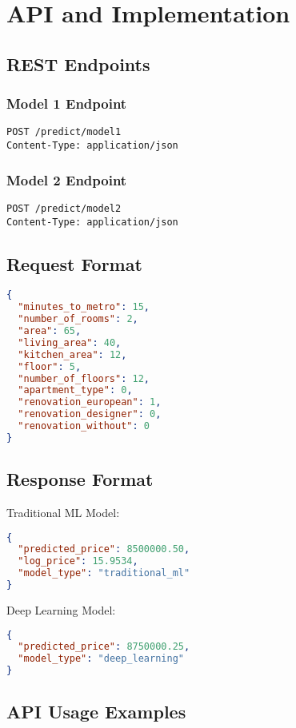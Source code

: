 \documentclass[12pt,a4paper]{report}
\begin{document}
\chapter{API and Implementation}
\section{REST Endpoints}
\subsection{Model 1 Endpoint}
\begin{verbatim}
POST /predict/model1
Content-Type: application/json
\end{verbatim}

\subsection{Model 2 Endpoint}
\begin{verbatim}
POST /predict/model2
Content-Type: application/json
\end{verbatim}

\section{Request Format}
\begin{lstlisting}[language=json]
{
  "minutes_to_metro": 15,
  "number_of_rooms": 2,
  "area": 65,
  "living_area": 40,
  "kitchen_area": 12,
  "floor": 5,
  "number_of_floors": 12,
  "apartment_type": 0,
  "renovation_european": 1,
  "renovation_designer": 0,
  "renovation_without": 0
}
\end{lstlisting}

\section{Response Format}
Traditional ML Model:
\begin{lstlisting}[language=json]
{
  "predicted_price": 8500000.50,
  "log_price": 15.9534,
  "model_type": "traditional_ml"
}
\end{lstlisting}

Deep Learning Model:
\begin{lstlisting}[language=json]
{
  "predicted_price": 8750000.25,
  "model_type": "deep_learning"
}
\end{lstlisting}

\section{API Usage Examples}
\end{document}
